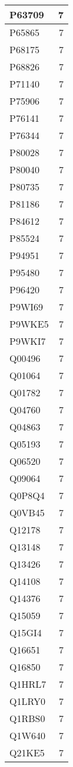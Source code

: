 \documentclass[
]{book}
\theoremstyle{definition}
\theoremstyle{definition}
\theoremstyle{definition}
\theoremstyle{definition}
\theoremstyle{remark}
\begin{document}
\begin{table}
\begin{tabular}{l|r}
\hline
P63709 & 7\\
\hline
P65865 & 7\\
\hline
P68175 & 7\\
\hline
P68826 & 7\\
\hline
P71140 & 7\\
\hline
P75906 & 7\\
\hline
P76141 & 7\\
\hline
P76344 & 7\\
\hline
P80028 & 7\\
\hline
P80040 & 7\\
\hline
P80735 & 7\\
\hline
P81186 & 7\\
\hline
P84612 & 7\\
\hline
P85524 & 7\\
\hline
P94951 & 7\\
\hline
P95480 & 7\\
\hline
P96420 & 7\\
\hline
P9WI69 & 7\\
\hline
P9WKE5 & 7\\
\hline
P9WKI7 & 7\\
\hline
Q00496 & 7\\
\hline
Q01064 & 7\\
\hline
Q01782 & 7\\
\hline
Q04760 & 7\\
\hline
Q04863 & 7\\
\hline
Q05193 & 7\\
\hline
Q06520 & 7\\
\hline
Q09064 & 7\\
\hline
Q0P8Q4 & 7\\
\hline
Q0VB45 & 7\\
\hline
Q12178 & 7\\
\hline
Q13148 & 7\\
\hline
Q13426 & 7\\
\hline
Q14108 & 7\\
\hline
Q14376 & 7\\
\hline
Q15059 & 7\\
\hline
Q15GI4 & 7\\
\hline
Q16651 & 7\\
\hline
Q16850 & 7\\
\hline
Q1HRL7 & 7\\
\hline
Q1LRY0 & 7\\
\hline
Q1RBS0 & 7\\
\hline
Q1W640 & 7\\
\hline
Q21KE5 & 7\\

\end{tabular}
\end{table}
\end{document}
